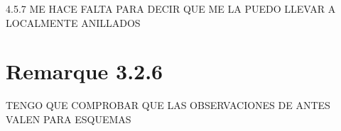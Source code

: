 \documentclass[twoside]{article}
\begin{document}
\begin{remarque}{4.5.7}
ME HACE FALTA PARA DECIR QUE ME LA PUEDO LLEVAR A LOCALMENTE ANILLADOS
\end{remarque}


\section{Remarque 3.2.6}

TENGO QUE COMPROBAR QUE LAS OBSERVACIONES DE ANTES VALEN PARA ESQUEMAS 
%
%
%
%
%
%
%
\end{document}
